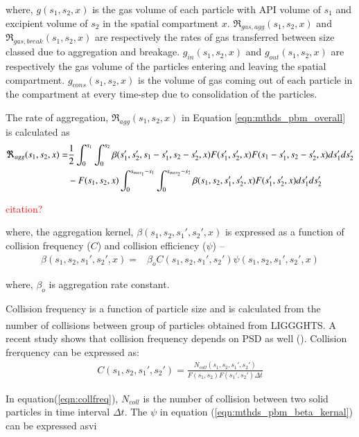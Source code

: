 \documentclass[preprint,11pt,authoryear]{elsarticle}
\begin{document}
	    \par where, $g(s_1,s_2,x)$ is the gas volume of each particle with API volume of $s_1$ and excipient volume of $s_2$ in the spatial compartment $x$. $\Re_{gas,agg}(s_1,s_2,x)$ and $\Re_{gas,break}(s_1,s_2,x)$ are respectively the rates of gas transferred between size classed due to aggregation and breakage. $g_{in}(s_1,s_2,x)$ and $g_{out}(s_1,s_2,x)$ are respectively the gas volume of the particles entering and leaving the spatial compartment. $g_{cons}(s_1,s_2,x)$ is the volume of gas coming out of each particle in the compartment at every time-step due to consolidation of the particles. 
	    \par The rate of aggregation, $\Re_{agg}(s_1,s_2,x)$ in Equation \ref{eqn:mthds_pbm_overall} is calculated as  
	     \begin{align}
	     \Re_{agg}(s_1,s_2,x)=& \frac{1}{2}\int _0^{s_1} \int_0^{s_2} \beta(s_1',s_2',s_1-s_1',s_2-s_2',x)F(s_1',s_2',x)F(s_1-s_1',s_2-s_2',x)ds_1'ds_2'\notag\\ 
	     &- F(s_1,s_2,x)\int _0^{s_{max_1}-s_1} \int_0^{s_{max_2}-s_2} \beta(s_1,s_2,s_1',s_2',x)F(s_1',s_2',x)ds_1'ds_2'
	     \end{align}
	     \par \textcolor{red}{citation?}
	     
	    \par where, the aggregation kernel, $\beta(s_1,s_2, s_1',s_2',x)$ is expressed as a function of collision frequency ($C$) and collision efficiency ($\psi$) –
	    \begin{align}
	    \beta(s_1,s_2,s_1',s_2',x) = & \beta_oC(s_1,s_2,s_1',s_2')\psi(s_1,s_2,s_1',s_2',x)
	    \label{eqn:mthds_pbm_beta_kernal}
	    \end{align}
	    
	    where, $\beta_o$ is aggregation rate constant.
	    \par Collision frequency is a function of particle size and is calculated from the number of collisions between group of particles obtained from LIGGGHTS\textsuperscript{\textregistered}. A recent study shows that collision frequency depends on PSD as well (\cite{sen2014}). Collision frerquency can be expressed as:
	    \begin{align}
	    C(s_1,s_2,s_1',s_2')=\frac{N_{coll}(s_1,s_2,s_1',s_2')}{F(s_1,s_2)F(s_1',s_2')\Delta t}
	    \label{eqn:collfreq}
	    \end{align}
	    \par In equation(\ref{eqn:collfreq}), $N_{coll}$ is the number of collision between two solid particles in time interval $\Delta t$. The $\psi$ in equation (\ref{eqn:mthds_pbm_beta_kernal}) can be expressed asvi 
	    
\end{document}
